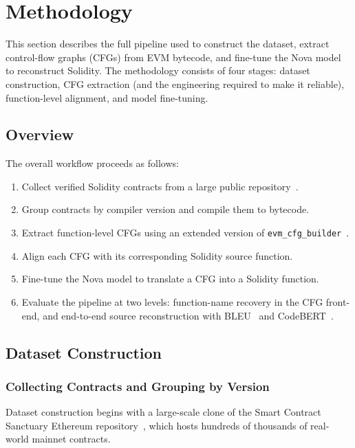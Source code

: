 \documentclass{stylefiles/capstone}
\begin{document}
\section{Methodology}

This section describes the full pipeline used to construct the dataset, extract
control-flow graphs (CFGs) from EVM bytecode, and fine-tune the Nova model to
reconstruct Solidity. The methodology consists of four stages: dataset
construction, CFG extraction (and the engineering required to make it reliable),
function-level alignment, and model fine-tuning.

\subsection{Overview}

The overall workflow proceeds as follows:

\begin{enumerate}
    \item Collect verified Solidity contracts from a large public
          repository~\cite{smart_contract_sanctuary}.
    \item Group contracts by compiler version and compile them to bytecode.
    \item Extract function-level CFGs using an extended version of
          \texttt{evm\_cfg\_builder}~\cite{evm_cfg_builder}.
    \item Align each CFG with its corresponding Solidity source function.
    \item Fine-tune the Nova model to translate a CFG into a Solidity function.
    \item Evaluate the pipeline at two levels: function-name recovery in the CFG
          front-end, and end-to-end source reconstruction with
          BLEU~\cite{papineni2002bleu} and CodeBERT~\cite{feng2020codebert}.
\end{enumerate}

\subsection{Dataset Construction}

\subsubsection{Collecting Contracts and Grouping by Version}

Dataset construction begins with a large-scale clone of the Smart Contract
Sanctuary Ethereum repository~\cite{smart_contract_sanctuary}, which hosts hundreds
of thousands of real-world mainnet contracts.
\end{document}
